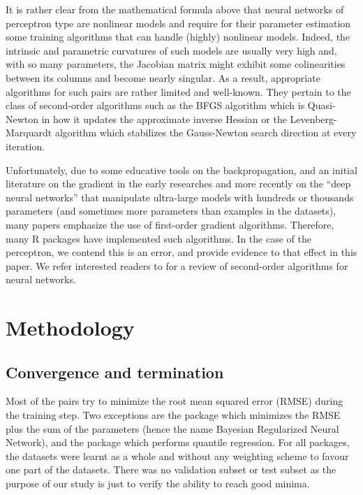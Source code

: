 It is rather clear from the mathematical formula above that neural
networks of perceptron type are nonlinear models and require for their
parameter estimation some training algorithms that can handle (highly)
nonlinear models. Indeed, the intrinsic and parametric curvatures of
such models are usually very high and, with so many parameters, the
Jacobian matrix might exhibit some colinearities between its columns and
become nearly singular. As a result, appropriate algorithms for such
 pairs are rather limited and well-known. They
pertain to the class of second-order algorithms such as the BFGS
algorithm which is Quasi-Newton in how it updates the approximate
inverse Hessian or the Levenberg-Marquardt algorithm which stabilizes
the Gauss-Newton search direction at every iteration.

Unfortunately, due to some educative tools on the backpropagation, and
an initial literature on the gradient in the early researches and more
recently on the ``deep neural networks'' that manipulate ultra-large
models with hundreds or thousands parameters (and sometimes more
parameters than examples in the datasets), many papers emphasize the use
of first-order gradient algorithms. Therefore, many \textsf{R} packages
have implemented such algorithms. In the case of the perceptron, we
contend this is an error, and provide evidence to that effect in this
paper. We refer interested readers to \citep{tan2019review} for a review
of second-order algorithms for neural networks.

\hypertarget{methodology}{%
\section{Methodology}\label{methodology}}

\hypertarget{convergence-and-termination}{%
\subsection{Convergence and
termination}\label{convergence-and-termination}}

Most of the  pairs try to minimize the root mean
squared error (RMSE) during the training step. Two exceptions are the
 package which minimizes the RMSE plus the sum of the
parameters (hence the name Bayesian Regularized Neural Network), and the
 package which performs quantile regression. For all
packages, the datasets were learnt as a whole and without any weighting
scheme to favour one part of the datasets. There was no validation
subset or test subset as the purpose of our study is just to verify the
ability to reach good minima.

